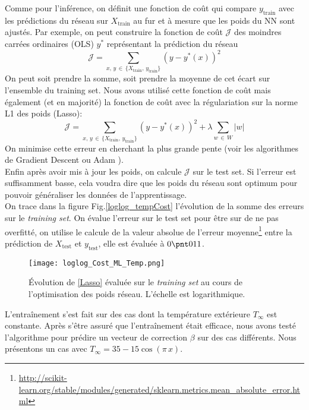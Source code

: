 \documentclass[a4paper,12pt]{article}
\newcommand{\bepar}[1]{
	\left( #1 \right)  
}
\newcommand{\J}{\mathcal{J}}
\newcommand{\tinf}{$T_\infty$}
\numberwithin{equation}{section} %
\begin{document}
\noindent Comme pour l'inférence, on définit une fonction de coût qui compare $y_{\text{train}}$ avec les prédictions du réseau sur $X_{\text{train}}$ au fur et à mesure que les poids du NN sont ajustés. Par exemple, on peut construire la fonction de coût $\J$ des moindres carrées ordinaires (OLS) $y^*$ représentant la prédiction du réseau 
\begin{equation}
\J = \sum_{x, \, y\, \in\, \{X_{\text{train}},\, y_{\text{train}}\}} \bepar{y - y^*\bepar{x}}^2 \tag{OLS} \label{JOLS}
\end{equation}
On peut soit prendre la somme, soit prendre la moyenne de cet écart sur l'ensemble du training set. Nous avons utilisé cette fonction de coût mais également (et en majorité) la fonction de coût avec la régulariation sur la norme L1 des poids (Lasso):
\begin{equation}
\J = \sum_{x, \, y\, \in\, \{X_{\text{train}},\, y_{\text{train}}\}} \bepar{y - y^*\bepar{x}}^2 + \lambda \sum_{w\, \in\, W} |w| \tag{Lasso} \label{Lasso}
\end{equation}
On minimise cette erreur en cherchant la plus grande pente (voir les algorithmes de Gradient Descent \citep{Goodfellow-et-al-2016} ou Adam \citep{kingma2014adam}).\\
Enfin après avoir mis à jour les poids, on calcule $\J$ sur le test set. Si l'erreur est suffisamment basse, cela voudra dire que les poids du réseau sont optimum pour pouvoir généraliser les données de l'apprentissage.\\

\noindent On trace dans la figure Fig.\eqref{loglog_tempCost} l'évolution de la somme des erreurs sur le \textit{training set}. On évalue l'erreur sur le test set pour être sur de ne pas overfitté, on utilise le calcule de la valeur absolue de l'erreur moyenne\footnote{\url{http://scikit-learn.org/stable/modules/generated/sklearn.metrics.mean_absolute_error.html}} entre la prédiction de $X_{\text{test}}$ et $y_{\text{test}}$, elle est évaluée à $0 \pnt 011$.

\begin{figure}[!ht]
\centering
\texttt{[image: loglog\_Cost\_ML\_Temp.png]}
\caption{\small{Évolution de \eqref{Lasso} évaluée sur le \textit{training set} au cours de l'optimisation des poids réseau. L'échelle est logarithmique.}}
\label{loglog_tempCost} \vspace{-3mm}
\end{figure}
\noindent L'entraînement s'est fait sur des cas dont la température extérieure \tinf $ $ est constante. Après s'être assuré que l'entraînement était efficace, nous avons testé l'algorithme pour prédire un vecteur de correction $\beta$ sur des cas différents. Nous présentons un cas avec $T_\infty =  35 - 15 \cos(\pi\,x)$.\\
\end{document}
